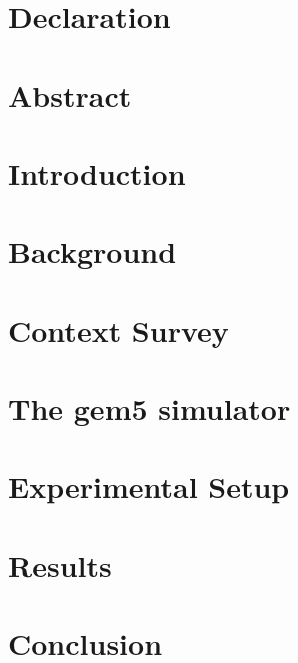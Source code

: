 \documentclass[12pt]{report}
\begin{document}
    
    
    
    \chapter*{Declaration}
    
    
    \chapter*{Abstract}
    
    
    \tableofcontents
    
    \chapter{Introduction}
    
    
    \chapter{Background}
    
    
    \chapter{Context Survey}
    
    
    \chapter{The gem5 simulator}
    
    
    \chapter{Experimental Setup}\label{ch:experimental-setup}
    
    
    \chapter{Results}
    
    
    \chapter{Conclusion}
    
    
\end{document}
